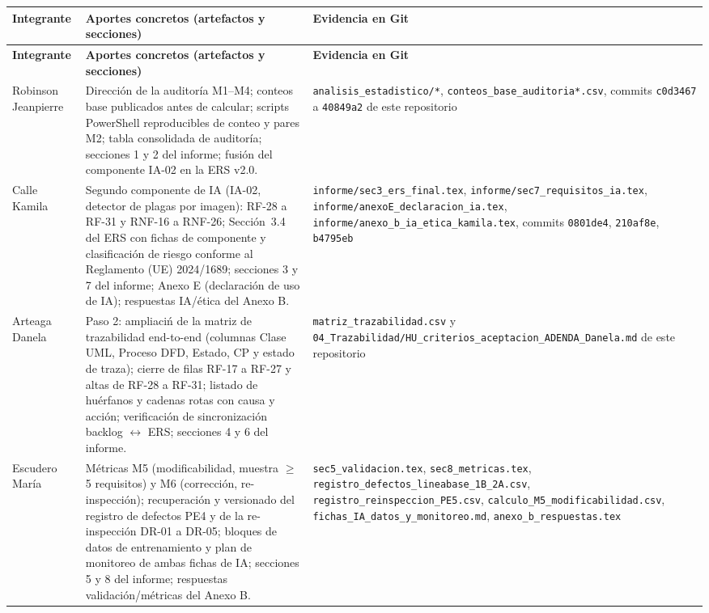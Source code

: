 \vspace{0.3cm}
\begin{center}
\begin{longtable}{|p{2.6cm}|p{6.6cm}|p{4.8cm}|}
\hline
\textbf{Integrante} & \textbf{Aportes concretos (artefactos y secciones)} & \textbf{Evidencia en Git} \\
\hline
\endfirsthead
\hline
\textbf{Integrante} & \textbf{Aportes concretos (artefactos y secciones)} & \textbf{Evidencia en Git} \\
\hline
\endhead
\hline
\endfoot
\hline
\endlastfoot

Robinson Jeanpierre & Direcci\'on de la auditor\'ia M1--M4; conteos base publicados antes de calcular; scripts PowerShell reproducibles de conteo y pares M2; tabla consolidada de auditor\'ia; secciones 1 y 2 del informe; fusi\'on del componente IA-02 en la ERS v2.0. & \texttt{analisis\_estadistico/*}, \texttt{conteos\_base\_auditoria*.csv}, commits \texttt{c0d3467} a \texttt{40849a2} de este repositorio \\ \hline

Calle Kamila & Segundo componente de IA (IA-02, detector de plagas por imagen): RF-28 a RF-31 y RNF-16 a RNF-26; Secci\'on~3.4 del ERS con fichas de componente y clasificaci\'on de riesgo conforme al Reglamento (UE) 2024/1689; secciones 3 y 7 del informe; Anexo E (declaraci\'on de uso de IA); respuestas IA/\'etica del Anexo B. & \texttt{informe/sec3\_ers\_final.tex}, \texttt{informe/sec7\_requisitos\_ia.tex}, \texttt{informe/anexoE\_declaracion\_ia.tex}, \texttt{informe/anexo\_b\_ia\_etica\_kamila.tex}, commits \texttt{0801de4}, \texttt{210af8e}, \texttt{b4795eb} \\ \hline

Arteaga Danela & Paso 2: ampliaci\'n de la matriz de trazabilidad end-to-end (columnas Clase UML, Proceso DFD, Estado, CP y estado de traza); cierre de filas RF-17 a RF-27 y altas de RF-28 a RF-31; listado de hu\'erfanos y cadenas rotas con causa y acci\'on; verificaci\'on de sincronizaci\'on backlog $\leftrightarrow$ ERS; secciones 4 y 6 del informe. & \texttt{matriz\_trazabilidad.csv} y \texttt{04\_Trazabilidad/HU\_criterios\_aceptacion\_ADENDA\_Danela.md} de este repositorio \\ \hline

Escudero Mar\'ia & M\'etricas M5 (modificabilidad, muestra $\geq$5 requisitos) y M6 (correcci\'on, re-inspecci\'on); recuperaci\'on y versionado del registro de defectos PE4 y de la re-inspecci\'on DR-01 a DR-05; bloques de datos de entrenamiento y plan de monitoreo de ambas fichas de IA; secciones 5 y 8 del informe; respuestas validaci\'on/m\'etricas del Anexo B. & \texttt{sec5\_validacion.tex}, \texttt{sec8\_metricas.tex}, \texttt{registro\_defectos\_lineabase\_1B\_2A.csv}, \texttt{registro\_reinspeccion\_PE5.csv}, \texttt{calculo\_M5\_modificabilidad.csv}, \texttt{fichas\_IA\_datos\_y\_monitoreo.md}, \texttt{anexo\_b\_respuestas.tex} \\ \hline


\end{longtable}
\end{center}
